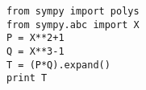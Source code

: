 \begin{verbatim}
from sympy import polys
from sympy.abc import X
P = X**2+1
Q = X**3-1
T = (P*Q).expand()
print T
\end{verbatim}
